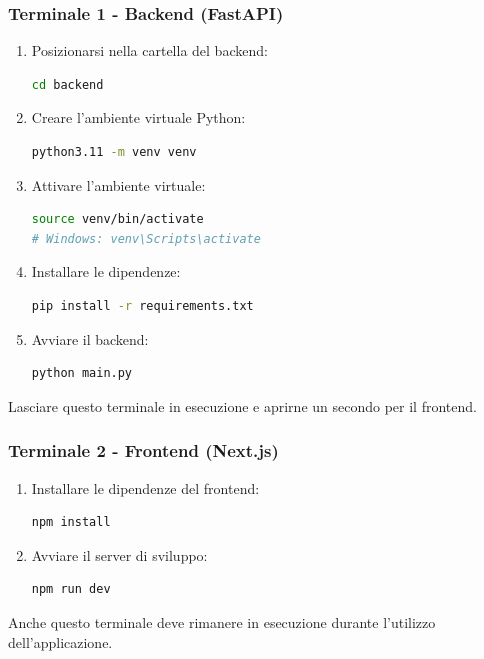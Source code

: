 \documentclass[a4paper, 11pt, oneside]{scrartcl}
\begin{document}
\subsubsection{Terminale 1 - Backend (FastAPI)}
\begin{enumerate}
    \item Posizionarsi nella cartella del backend:
          \begin{lstlisting}[language=bash]
cd backend
\end{lstlisting}
    \item Creare l'ambiente virtuale Python:
          \begin{lstlisting}[language=bash]
python3.11 -m venv venv
\end{lstlisting}
    \item Attivare l'ambiente virtuale:
          \begin{lstlisting}[language=bash]
source venv/bin/activate
# Windows: venv\Scripts\activate
\end{lstlisting}
    \item Installare le dipendenze:
          \begin{lstlisting}[language=bash]
pip install -r requirements.txt
\end{lstlisting}
    \item Avviare il backend:
          \begin{lstlisting}[language=bash]
python main.py
\end{lstlisting}
\end{enumerate}

Lasciare questo terminale in esecuzione e aprirne un secondo per il frontend.

\subsubsection{Terminale 2 - Frontend (Next.js)}
\begin{enumerate}
    \item Installare le dipendenze del frontend:
          \begin{lstlisting}[language=bash]
npm install
\end{lstlisting}
    \item Avviare il server di sviluppo:
          \begin{lstlisting}[language=bash]
npm run dev
\end{lstlisting}
\end{enumerate}

Anche questo terminale deve rimanere in esecuzione durante l'utilizzo dell'applicazione.
\end{document}
